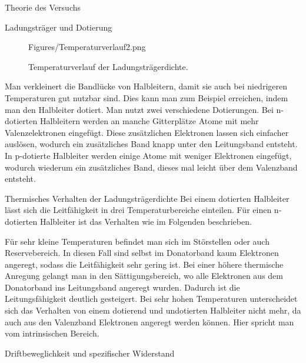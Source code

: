 \documentclass[pdftex, a4paper,11pt, twoside, ngerman]{report}
\begin{document}
\begin{chapter}{Theorie des Versuchs}
\begin{section}{Ladungsträger und Dotierung}
\begin{figure}[b!]
\begin{minipage}{.45\textwidth}
                    {Figures/Temperaturverlauf2.png}
                \caption{Temperaturverlauf der Ladungsträgerdichte.
                    \cite{bib:Temperaturverlauf2}}
                \label{fig:TemperaturverlaufLeifaehigkeit}
              \end{minipage}
            \end{figure}
            
            Man verkleinert die Bandlücke von Halbleitern, damit sie auch bei niedrigeren Temperaturen gut nutzbar sind.
            Dies kann man zum Beispiel erreichen, indem man den Halbleiter dotiert.
            Man nutzt zwei verschiedene Dotierungen. 
            Bei n-dotierten Halbleitern werden an manche Gitterplätze Atome mit mehr Valenzelektronen eingefügt.
            Diese zusätzlichen Elektronen lassen sich einfacher auslösen, wodurch ein zusätzliches Band knapp unter den Leitungsband entsteht.
            In p-dotierte Halbleiter werden einige Atome mit weniger Elektronen eingefügt, wodurch wiederum ein zusätzliches Band, dieses mal leicht über dem Valenzband entsteht.

        \end{section}

        \begin{section}{Thermisches Verhalten der Ladungsträgerdichte}
            Bei einem dotierten Halbleiter lässt sich die Leitfähigkeit in drei Temperaturbereiche einteilen.
            Für einen n-dotierten Halbleiter ist das Verhalten wie im Folgenden beschrieben.
            
            Für sehr kleine Temperaturen befindet man sich im Störstellen oder auch Reservebereich. In diesen Fall sind selbst im Donatorband kaum Elektronen angeregt, sodass die Leitfähigkeit sehr gering ist.
            Bei einer höhere thermische Anregung gelangt man in den Sättigungsbereich, wo alle Elektronen aus dem Donatorband ins Leitungsband angeregt wurden.
            Dadurch ist die Leitungsfähigkeit deutlich gesteigert.
            Bei sehr hohen Temperaturen unterscheidet sich das Verhalten von einem dotierend und undotierten Halbleiter nicht mehr, da auch aus den Valenzband Elektronen angeregt werden können.
            Hier spricht man vom intrinsischen Bereich.

        \end{section}

        \begin{section}{Driftbeweglichkeit und spezifischer Widerstand}


\end{section}
\end{chapter}
\end{document}
